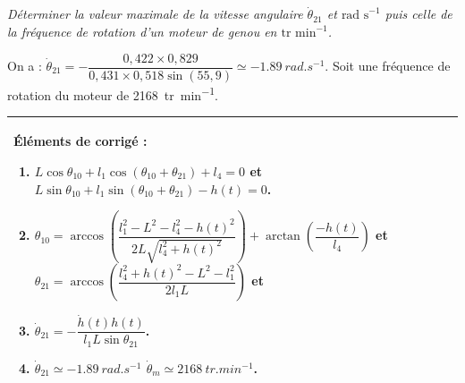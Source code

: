 \documentclass[10pt,fleqn]{article} %
\begin{document}
\begin{multicols}{2}
\subparagraph{}\textit{Déterminer la valeur maximale de la vitesse angulaire $\dot{\theta}_{21}$ et $\text{rad s}^{-1}$ puis celle de la fréquence de rotation d’un moteur de genou en $\text{tr min}^{-1}$.}
\ifprof
\begin{corrige}
On a : $\dot{\theta}_{21} =-\dfrac{0,422 \times 0,829}{0,431\times 0,518\sin \left(55,9\right)}\simeq -\SI{1,89}{rad.s^{-1}}$. Soit une fréquence de rotation du moteur de \SI{2168}{tr.min^{-1}}.
\end{corrige}
\else
\fi


\ifprof
\else

\footnotesize
\begin{tabular}{|p{.95\linewidth}|}
\hline
Éléments de corrigé :
\begin{enumerate}
\item $L\cos\theta_{10} +l_1\cos\left(\theta_{10}+\theta_{21}\right)+l_4={0}$ et 
$L\sin\theta_{10}  +l_1\sin\left(\theta_{10}+\theta_{21}\right)-h(t) ={0}$.
\item $\theta_{10} =\arccos \left( \dfrac{l_1^2 - L^2-l_4^2 -h(t)^2}{2L{\sqrt{l_4^2 + h(t)^2}}}\right) + \arctan\left(\dfrac{-h(t)}{l_4} \right)$ et $\theta_{21}=\arccos\left(\dfrac{l_4 ^2 +h(t)^2- L^2 - l_1^2}{2l_1L}  \right)$ et 
\item $\dot{\theta}_{21} =-\dfrac{\dot{h}(t)h(t)}{l_1L\sin\theta_{21}}$.
\item $\dot{\theta}_{21} \simeq -\SI{1,89}{rad.s^{-1}}$ $\dot{\theta}_m\simeq \SI{2168}{tr.min^{-1}}$.
\end{enumerate} \\
\hline
\end{tabular}
\normalsize
\fi

\ifprof
\else
\end{multicols}
\fi

\end{document}
